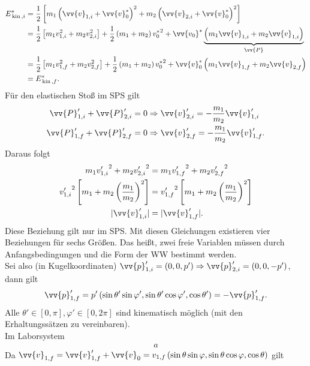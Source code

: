 \documentclass[a4paper,12pt]{article}
\numberwithin{equation}{section}
\begin{document}
\begin{align*}
        E^*_{\,\text{kin}\,,i}&=\dfrac{1}{2}\left[m_1\left(\vv{v}_{1,i}+\vv{v}_0^*\right)^2+m_2\left(\vv{v}_{2,i}+\vv{v}_0^*\right)^2\right]\\
                              &=\dfrac{1}{2}\left[m_1v_{1,i}^2+m_2v_{2,i}^2\right]+\dfrac{1}{2}\left(m_1+m_2\right){v_0^*}^2+\vv{v_0}^*\underbrace{\left(m_1\vv{v}_{1,i}+m_2\vv{v}_{1,i}\right)}_{\vv{P}}\\
                              &=\dfrac{1}{2}\left[m_1v_{1,f}^2+m_2v_{2,f}^2\right]+\dfrac{1}{2}\left(m_1+m_2\right){v_0^*}^2+\vv{v}_0^*\left(m_1\vv{v}_{1,f}+m_2\vv{v}_{2,f}\right)\\
                              &=E_{\,\text{kin}\,,f}^*
.\end{align*}
Für den elastischen Stoß im SPS gilt 
\begin{align*}
        \vv{P}_{1,i}'+\vv{P}_{2,i}'=0&\Rightarrow \vv{v}_{2,i}'=-\dfrac{m_1}{m_2}\vv{v}_{1,i}'\\
        \vv{P}_{1,f}'+\vv{P}_{2,f}'=0&\Rightarrow \vv{v}_{2,f}'=-\dfrac{m_1}{m_2}\vv{v}_{1,f}'
.\end{align*}
Daraus folgt
\begin{align*}
        m_1{v_{1,i}'}^2+m_2{v_{2,i}'}^2&=m_1{v_{1,f}'}^2+m_2{v_{2,f}'}^2\\
        {v_{1,i}'}^2\left[m_1+m_2\left(\dfrac{m_1}{m_2}\right)^2\right]&={v_{1,f}'}^2\left[m_1+m_2\left(\dfrac{m_1}{m_2}\right)^2\right]\\
        |\vv{v}_{1,i}'|&=|\vv{v}_{1,f}'|
.\end{align*}
Diese Beziehung gilt nur im SPS. Mit diesen Gleichungen existieren vier Beziehungen für sechs Größen. Das heißt, zwei freie Variablen müssen durch Anfangsbedingungen und die Form der WW bestimmt werden.\\\indent
Sei also (in Kugelkoordinaten) $\vv{p}_{1,i}'=\left(0,0,p'\right)\Rightarrow \vv{p}_{2,i}'=\left(0,0,-p'\right)$, dann gilt
\begin{align*}
        \vv{p}_{1,f}'=p'\left(\sin \theta '\sin \varphi ',\sin \theta '\cos \varphi ',\cos \theta '\right)=-\vv{p}_{1,f}'
.\end{align*}
Alle $\theta ' \in \left[0,\pi \right],\varphi ' \in \left[0,2\pi \right]$ sind kinematisch möglich (mit den Erhaltungssätzen zu vereinbaren).\\\indent
Im Laborsystem
\begin{align*}
               a 
\end{align*}
Da $\vv{v}_{1,f}=\vv{v}_{1,f}'+\vv{v}_0=v_{1,f}\left(\sin \theta \sin \varphi ,\sin \theta \cos \varphi ,\cos \theta \right)$ gilt 
\end{document}
